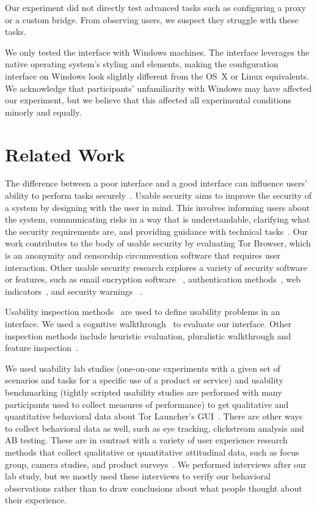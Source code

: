 \documentclass[USenglish,oneside,twocolumn]{article}
\begin{document}
Our experiment did not directly test advanced tasks such as configuring a proxy or a custom bridge. From observing  users, we suspect they struggle with these tasks. 

We only tested the interface with Windows machines.
The interface leverages the native operating system's styling and elements, making the configuration interface on Windows look slightly different from the OS~X or Linux equivalents. We acknowledge that participants' unfamiliarity with Windows may have affected our experiment, but we believe that this affected all experimental conditions minorly and equally.  

\section{Related Work}
\label{sec:related} 
The difference between a poor interface and a good interface can influence users’ ability to perform tasks securely~\cite{payne2008brief}. Usable security aims to improve the security of a system by designing with the user in mind. This involves informing users about the system, communicating risks in a way that is understandable, clarifying what the security requirements are, and providing guidance with technical tasks~\cite{adams1999users}. Our work contributes to the body of usable security by evaluating Tor Browser, which is an anonymity and censorship circumvention software that requires user interaction. Other usable security research explores a variety of security software or features, such as email encryption software ~\cite{whitten1999johnny}\cite{garfinkel2005johnny}, authentication methods~\cite{morris1979password}\cite{dhamija2000deja}\cite{suo2005graphical}, web indicators~\cite{dhamija2006phishing}\cite{akhawe2013alice}, and security warnings ~\cite{schechter2007emperor}\cite{egelman2008you}. 

Usability inspection methods~\cite{nielsen1994usability} are used to define usability problems in an interface. We
used a cognitive walkthrough~\cite{wharton1994cognitive}\cite{cognitive-walkthrough} to evaluate our interface. Other inspection methods include heuristic evaluation, pluralistic walkthrough and feature inspection~\cite{inspection}.  

We used usability lab studies (one-on-one experiments with a given set of scenarios and tasks for a specific use of  a product or service) and usability benchmarking (tightly scripted usability studies are performed with many participants used to collect measures of performance) to get qualitative and quantitative behavioral data about Tor Launcher's GUI~\cite{krol2016towards}. There are other ways to collect behavioral data as well, such as eye tracking, clickstream analysis and AB testing. These are in contrast with a variety of user experience research methods that collect qualitative or quantitative attitudinal data, such as focus group, camera studies, and product surveys~\cite{ux-methods}. We performed interviews after our lab study, but we mostly used these interviews to verify our behavioral observations rather than to draw conclusions about what people thought about their experience. 
 
\end{document}

